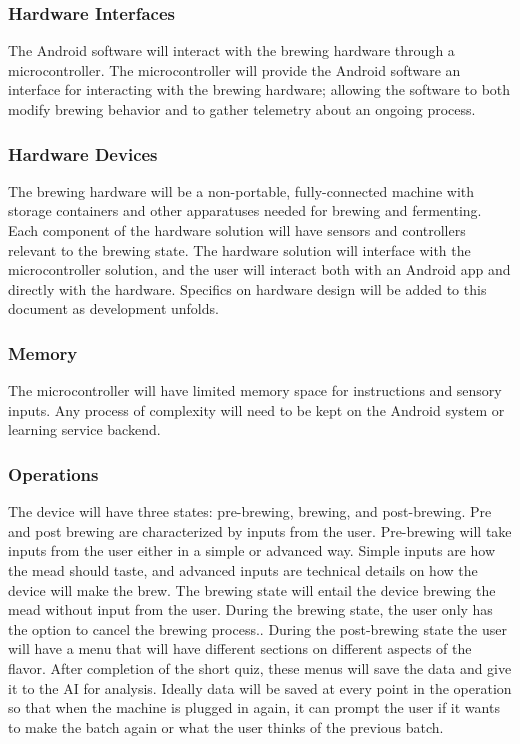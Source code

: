 \documentclass[draftclsnofoot,onecolumn,letterpaper,10pt]{IEEEtran}
\begin{document}
\subsubsection{Hardware Interfaces}
The Android software will interact with the brewing hardware through a microcontroller.
The microcontroller will provide the Android software an interface for interacting with 
the brewing hardware; allowing the software to both modify brewing behavior and to gather
telemetry about an ongoing process.

\subsubsection{Hardware Devices}
The brewing hardware will be a non-portable, fully-connected machine with storage containers 
and other apparatuses needed for brewing and fermenting. 
Each component of the hardware solution will have sensors and controllers relevant to the brewing
state.
The hardware solution will interface with the microcontroller solution, and the user will interact 
both with an Android app and directly with the hardware.
Specifics on hardware design will be added to this document as development unfolds.

\subsubsection{Memory}
The microcontroller will have limited memory space for instructions and sensory inputs. Any
process of complexity will need to be kept on the Android system or learning service backend.

\subsubsection{Operations}
The device will have three states: pre-brewing, brewing, and post-brewing.
Pre and post brewing are characterized by inputs from the user.
Pre-brewing will take inputs from the user either in a simple or advanced way.
Simple inputs are how the mead should taste, and advanced inputs are technical details on how the device will make the brew.
The brewing state will entail the device brewing the mead without input from the user.
During the brewing state, the user only has the option to cancel the brewing process..
During the post-brewing state the user will have a menu that will have different sections on different aspects of the flavor.
After completion of the short quiz, these menus will save the data and give it to the AI for analysis.
Ideally data will be saved at every point in the operation so that when the machine is plugged in again, it can prompt the user if it wants to make the batch again or what the user thinks of the previous batch.
\end{document}
